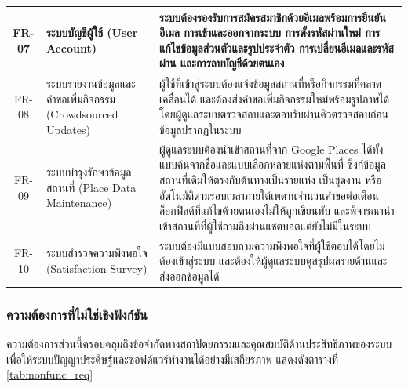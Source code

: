 \begin{longtable}{|c|p{4cm}|p{7cm}|}
FR-07 & ระบบบัญชีผู้ใช้ (User Account) & ระบบต้องรองรับการสมัครสมาชิกด้วยอีเมลพร้อมการยืนยันอีเมล การเข้าและออกจากระบบ การตั้งรหัสผ่านใหม่ การแก้ไขข้อมูลส่วนตัวและรูปประจำตัว การเปลี่ยนอีเมลและรหัสผ่าน และการลบบัญชีด้วยตนเอง \\ \hline
FR-08 & ระบบรายงานข้อมูลและคำขอเพิ่มกิจกรรม (Crowdsourced Updates) & ผู้ใช้ที่เข้าสู่ระบบต้องแจ้งข้อมูลสถานที่หรือกิจกรรมที่คลาดเคลื่อนได้ และต้องส่งคำขอเพิ่มกิจกรรมใหม่พร้อมรูปภาพได้ โดยผู้ดูแลระบบตรวจสอบและตอบรับผ่านคิวตรวจสอบก่อนข้อมูลปรากฏในระบบ \\ \hline
FR-09 & ระบบบำรุงรักษาข้อมูลสถานที่ (Place Data Maintenance) & ผู้ดูแลระบบต้องนำเข้าสถานที่จาก Google Places ได้ทั้งแบบค้นจากชื่อและแบบเลือกหลายแห่งตามพื้นที่ ซิงก์ข้อมูลสถานที่เดิมให้ตรงกับต้นทางเป็นรายแห่ง เป็นชุดงาน หรืออัตโนมัติตามรอบเวลาภายใต้เพดานจำนวนคำขอต่อเดือน ล็อกฟิลด์ที่แก้ไขด้วยตนเองไม่ให้ถูกเขียนทับ และพิจารณานำเข้าสถานที่ที่ผู้ใช้ถามถึงผ่านแชตบอตแต่ยังไม่มีในระบบ \\ \hline
FR-10 & ระบบสำรวจความพึงพอใจ (Satisfaction Survey) & ระบบต้องมีแบบสอบถามความพึงพอใจที่ผู้ใช้ตอบได้โดยไม่ต้องเข้าสู่ระบบ และต้องให้ผู้ดูแลระบบดูสรุปผลรายด้านและส่งออกข้อมูลได้ \\
\hline
\end{longtable}

\subsubsection{ความต้องการที่ไม่ใช่เชิงฟังก์ชัน}

ความต้องการส่วนนี้ครอบคลุมถึงข้อจำกัดทางสถาปัตยกรรมและคุณสมบัติด้านประสิทธิภาพของระบบ เพื่อให้ระบบปัญญาประดิษฐ์และซอฟต์แวร์ทำงานได้อย่างมีเสถียรภาพ แสดงดังตารางที่ \ref{tab:nonfunc_req}

